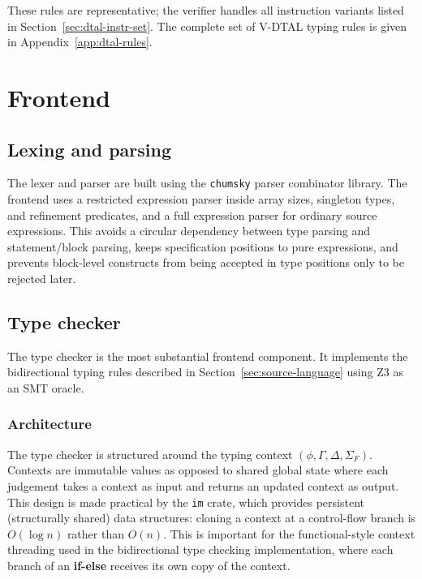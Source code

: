 These rules are representative; the verifier handles all instruction variants listed in Section~\ref{sec:dtal-instr-set}. The complete set of V-DTAL typing rules is given in Appendix~\ref{app:dtal-rules}.

\section{Frontend}\label{sec:frontend}

\subsection{Lexing and parsing}

The lexer and parser are built using the \texttt{chumsky} parser combinator library. The frontend uses a restricted expression parser inside array sizes, singleton types, and refinement predicates, and a full expression parser for ordinary source expressions. This avoids a circular dependency between type parsing and statement/block parsing, keeps specification positions to pure expressions, and prevents block-level constructs from being accepted in type positions only to be rejected later.

\subsection{Type checker}\label{sec:typechecker}

The type checker is the most substantial frontend component. It implements the bidirectional typing rules described in Section~\ref{sec:source-language} using Z3 as an SMT oracle.

\subsubsection{Architecture}

The type checker is structured around the typing context $(\phi, \Gamma, \Delta, \Sigma_F)$. Contexts are immutable values as opposed to shared global state where each judgement takes a context as input and returns an updated context as output. This design is made practical by the \texttt{im} crate, which provides persistent (structurally shared) data structures: cloning a context at a control-flow branch is $O(\log n)$ rather than $O(n)$. This is important for the functional-style context threading used in the bidirectional type checking implementation, where each branch of an \textbf{if-else} receives its own copy of the context.

